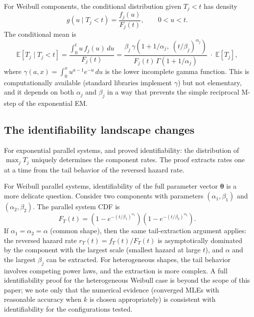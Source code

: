 \documentclass[12pt]{article}
\theoremstyle{definition}
\theoremstyle{remark}
\newcommand{\E}{\mathbb{E}}
\newcommand{\btheta}{\bm{\theta}}
\begin{document}
For Weibull components, the conditional distribution given
$T_j < t$ has density
\begin{equation}\label{eq:truncated-weibull}
  g(u \mid T_j < t) = \frac{f_j(u)}{F_j(t)}, \qquad 0 < u < t.
\end{equation}
The conditional mean is
\begin{equation}\label{eq:truncated-weibull-mean}
  \E[T_j \mid T_j < t]
  = \frac{\int_0^t u\, f_j(u)\, du}{F_j(t)}
  = \frac{\beta_j\, \gamma(1 + 1/\alpha_j,\;
    (t/\beta_j)^{\alpha_j})}{F_j(t)\,
    \Gamma(1 + 1/\alpha_j)}\; \cdot\;
  \E[T_j],
\end{equation}
where $\gamma(a, x) = \int_0^x u^{a-1} e^{-u}\, du$ is the lower
incomplete gamma function.  This is computationally available
(standard libraries implement $\gamma$) but not elementary, and it
depends on both $\alpha_j$ and $\beta_j$ in a way that prevents
the simple reciprocal M-step of the exponential EM.

\subsection{The identifiability landscape changes}

For exponential parallel systems, \citet{BasuGhosh1980} and
\citet{Towell2026} proved identifiability: the distribution of
$\max_j T_j$ uniquely determines the component rates.  The proof
extracts rates one at a time from the tail behavior of the reversed
hazard rate.

For Weibull parallel systems, identifiability of the full
parameter vector $\btheta$ is a more delicate question.
Consider two components with parameters $(\alpha_1, \beta_1)$ and
$(\alpha_2, \beta_2)$.  The parallel system CDF is
\[
  F_T(t) = (1 - e^{-(t/\beta_1)^{\alpha_1}})
            (1 - e^{-(t/\beta_2)^{\alpha_2}}).
\]
If $\alpha_1 = \alpha_2 = \alpha$ (common shape), then the same
tail-extraction argument applies: the reversed hazard rate
$r_T(t) = f_T(t)/F_T(t)$ is asymptotically dominated by the
component with the largest scale (smallest hazard at large $t$),
and $\alpha$ and the largest $\beta_j$ can be extracted.  For
heterogeneous shapes, the tail behavior involves competing power
laws, and the extraction is more complex.  A full identifiability
proof for the heterogeneous Weibull case is beyond the scope of this
paper; we note only that the numerical evidence (converged MLEs with
reasonable accuracy when $k$ is chosen appropriately) is consistent
with identifiability for the configurations tested.
\end{document}
